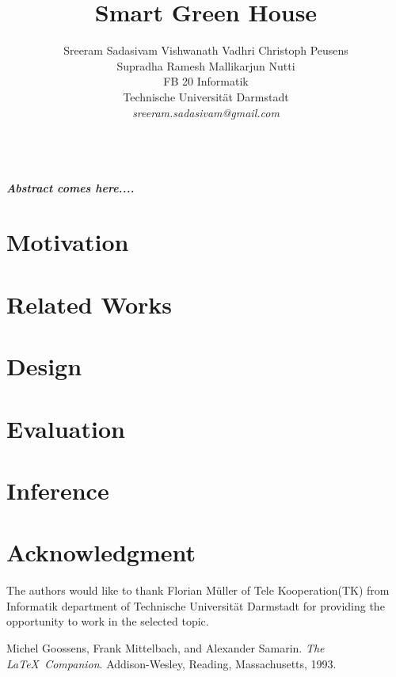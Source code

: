 \documentclass[10pt]{article}
\begin{document}
\title{\textbf{Smart Green House}}
\author{
\quad Sreeram Sadasivam \quad Vishwanath Vadhri \quad Christoph Peusens\\
\quad Supradha Ramesh \quad Mallikarjun Nutti\\
FB 20 Informatik\\
Technische Universität Darmstadt\\
\emph{sreeram.sadasivam@gmail.com}\\
\date{}
}
\maketitle
\textbf{\abstractname{
\emph {\textbf{\\
Abstract comes here....}}}}

\section{Motivation}


\section{Related Works}



\section{Design}


\section{Evaluation}


\section{Inference}


\section*{Acknowledgment}

The authors would like to thank Florian Müller of Tele Kooperation(TK) from Informatik department of Technische Universität Darmstadt for providing the opportunity to work in the selected topic.


\begin{thebibliography}{9}
Michel Goossens, Frank Mittelbach, and Alexander Samarin. 
\textit{The \LaTeX\ Companion}. 
Addison-Wesley, Reading, Massachusetts, 1993.
 
\end{thebibliography}
\end{document}
